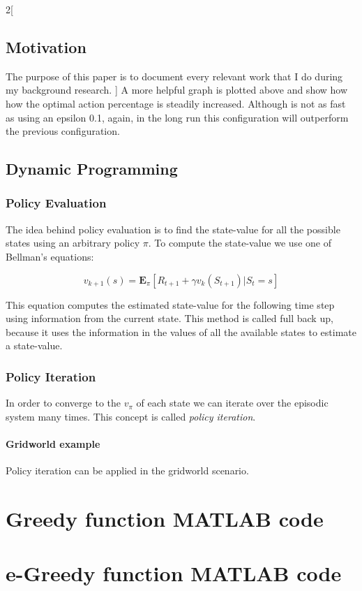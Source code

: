 \documentclass[a4paper]{article}
\begin{document}
\begin{multicols}{2}[
		\section*{Motivation}
		The purpose of this paper is to document every relevant work that I do during my background research.
		]
		A more helpful graph is plotted above and show how how the optimal action percentage is steadily increased. Although is not as fast as using an epsilon 0.1, again, in the long run this configuration will outperform the previous configuration.
		
		\section{Dynamic Programming}
		\subsection{Policy Evaluation}
		The idea behind policy evaluation is to find the state-value for all the possible states using an arbitrary policy $\pi$. To compute the state-value we use one of Bellman's equations:
		
		\begin{equation}
			v_{k+1}(s) = \mathbf{E}_\pi[R_{t+1} + \gamma v_k(S_{t+1}) | S_t = s]
		\end{equation}
		
		This equation computes the estimated state-value for the following time step using information from the current state. This method is called full back up, because it uses the information in the values of all the available states to estimate a state-value.
		
		\subsection{Policy Iteration}
		In order to converge to the $v_\pi$ of each state we can iterate over the episodic system many times. This concept is called \textit{policy iteration}.
		
		\subsubsection{Gridworld example}
		Policy iteration can be applied in the gridworld scenario.
		
		
		
		
		\end{multicols}
		\pagebreak
	
		\begin{appendices}
		\chapter{Greedy function MATLAB code}
			
		\chapter{e-Greedy function MATLAB code}
			
		\end{appendices}
\end{document}

